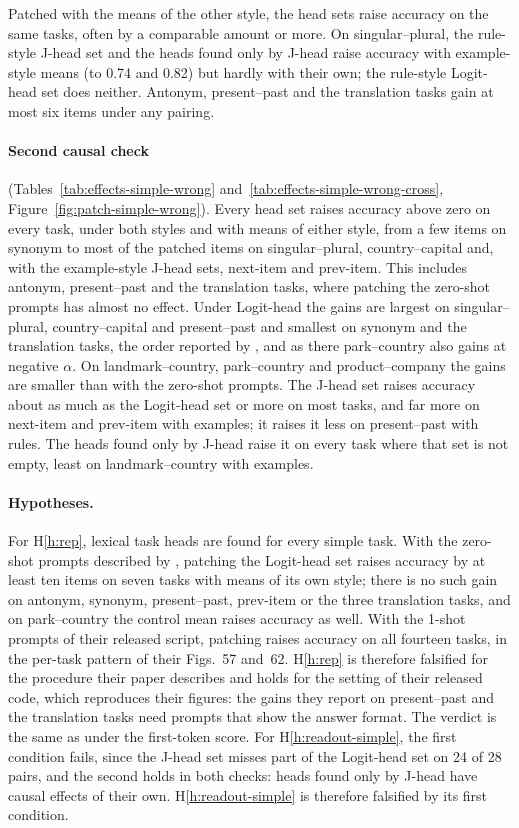 \documentclass[11pt,a4paper]{article}
\begin{document}
Patched with the means of the other style, the head sets raise accuracy on the same tasks, often by a comparable amount or more. On singular--plural, the rule-style J-head set and the heads found only by J-head raise accuracy with example-style means (to 0.74 and 0.82) but hardly with their own; the rule-style Logit-head set does neither. Antonym, present--past and the translation tasks gain at most six items under any pairing.

\paragraph{Second causal check} (Tables~\ref{tab:effects-simple-wrong} and~\ref{tab:effects-simple-wrong-cross}, Figure~\ref{fig:patch-simple-wrong}). Every head set raises accuracy above zero on every task, under both styles and with means of either style, from a few items on synonym to most of the patched items on singular--plural, country--capital and, with the example-style J-head sets, next-item and prev-item. This includes antonym, present--past and the translation tasks, where patching the zero-shot prompts has almost no effect. Under Logit-head the gains are largest on singular--plural, country--capital and present--past and smallest on synonym and the translation tasks, the order reported by \citet[Figs.~57 and~62]{yang2026shared}, and as there park--country also gains at negative $\alpha$. On landmark--country, park--country and product--company the gains are smaller than with the zero-shot prompts. The J-head set raises accuracy about as much as the Logit-head set or more on most tasks, and far more on next-item and prev-item with examples; it raises it less on present--past with rules. The heads found only by J-head raise it on every task where that set is not empty, least on landmark--country with examples.

\paragraph{Hypotheses.} For H\ref{h:rep}, lexical task heads are found for every simple task. With the zero-shot prompts described by \citet[App.~G.1]{yang2026shared}, patching the Logit-head set raises accuracy by at least ten items on seven tasks with means of its own style; there is no such gain on antonym, synonym, present--past, prev-item or the three translation tasks, and on park--country the control mean raises accuracy as well. With the 1-shot prompts of their released script, patching raises accuracy on all fourteen tasks, in the per-task pattern of their Figs.~57 and~62. H\ref{h:rep} is therefore falsified for the procedure their paper describes and holds for the setting of their released code, which reproduces their figures: the gains they report on present--past and the translation tasks need prompts that show the answer format. The verdict is the same as under the first-token score. For H\ref{h:readout-simple}, the first condition fails, since the J-head set misses part of the Logit-head set on 24 of 28 pairs, and the second holds in both checks: heads found only by J-head have causal effects of their own. H\ref{h:readout-simple} is therefore falsified by its first condition.
\end{document}
